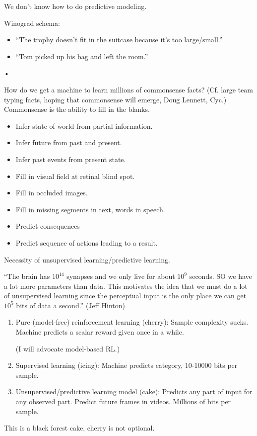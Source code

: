 We don't know how to do predictive modeling.

Winograd schema: 
\begin{itemize}
\item
``The trophy doesn't fit in the suitcase because it's too large/small.''
\item
``Tom picked up his bag and left the room.''
\end{itemize}•

How do we get a machine to learn millions of commonsense facts?
(Cf. large team typing facts, hoping that commonsense will emerge, Doug Lennett, Cyc.) %
Commonsense is the ability to fill in the blanks.
\begin{itemize}
\item
Infer state of world from partial information.
\item
Infer future from past and present.
\item
Infer past events from present state.
\item
Fill in visual field at retinal blind spot.
\item
Fill in occluded images.
\item
Fill in missing segments in text, words in speech.
\item
Predict consequences
\item
Predict sequence of actions leading to a result.
\end{itemize}

Necessity of unsupervised learning/predictive learning.

``The brain has $10^{14}$ synapses and we only live for about $10^9$ seconds. SO we have a lot more parameters than data. This motivates the idea that we must do a lot of unsupervised learning since the perceptual input is the only place we can get $10^5$ bits of data a second.'' (Jeff Hinton)

\begin{enumerate}
\item
Pure (model-free) reinforcement learning (cherry): Sample complexity sucks.
Machine predicts a scalar reward given once in a while.

(I will advocate model-based RL.)
\item
Supervised learning (icing): Machine predicts category, 10-10000 bits per sample.
\item
Unsupervised/predictive learning model (cake): Predicts any part of input for any observed part. Predict future frames in videos. Millions of bits per sample. 
\end{enumerate}
This is a black forest cake, cherry is not optional.

